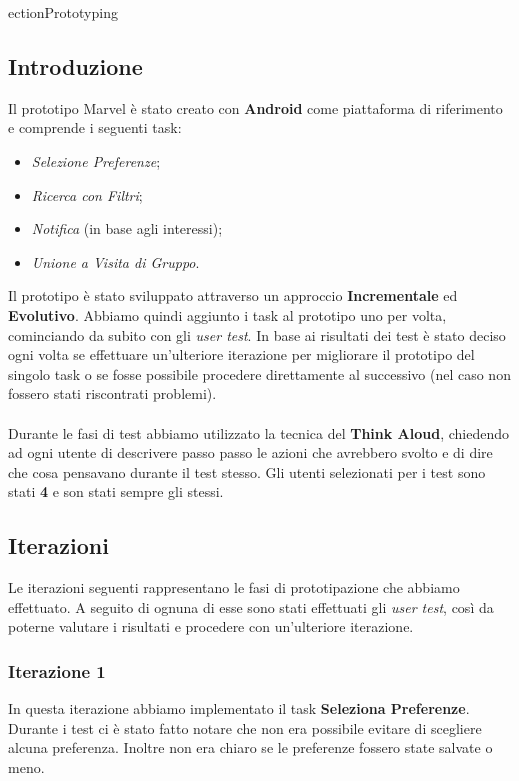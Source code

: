 ection{Prototyping}

\subsection{Introduzione}
Il prototipo Marvel è stato creato con \textbf{Android} come piattaforma di riferimento e comprende i seguenti task:
\begin{itemize}
    \item \textit{Selezione  Preferenze};
    \item \textit{Ricerca con Filtri};
    \item \textit{Notifica} (in base agli interessi);
    \item \textit{Unione a Visita di Gruppo}.
\end{itemize}

Il prototipo è stato sviluppato attraverso un approccio \textbf{Incrementale} ed \textbf{Evolutivo}. Abbiamo quindi aggiunto i task al prototipo uno per volta, cominciando da subito con gli \textit{user test}. In base ai risultati dei test è stato deciso ogni volta se effettuare un'ulteriore iterazione per migliorare il prototipo del singolo task o se fosse possibile procedere direttamente al successivo (nel caso non fossero stati riscontrati problemi). 

\paragraph{}
Durante le fasi di test abbiamo utilizzato la tecnica del \textbf{Think Aloud}, chiedendo ad ogni utente di descrivere passo passo le azioni che avrebbero svolto e di dire che cosa pensavano durante il test stesso. Gli utenti selezionati per i test sono stati \textbf{4} e son stati sempre gli stessi.

\subsection{Iterazioni}
Le iterazioni seguenti rappresentano le fasi di prototipazione che abbiamo effettuato. A seguito di ognuna di esse sono stati effettuati gli \textit{user test}, così da poterne valutare i risultati e procedere con un'ulteriore iterazione.

\subsubsection{Iterazione 1}
In questa iterazione abbiamo implementato il task \textbf{Seleziona Preferenze}. Durante i test ci è stato fatto notare che non era possibile evitare di scegliere alcuna preferenza. Inoltre non era chiaro se le preferenze fossero state salvate o meno.

